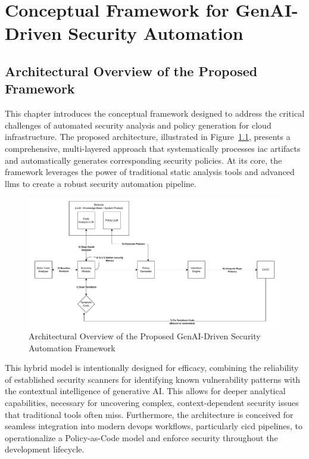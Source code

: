 \chapter{Conceptual Framework for GenAI-Driven Security Automation}


\section{Architectural Overview of the Proposed Framework}

This chapter introduces the conceptual framework designed to address the critical challenges of automated security analysis and policy generation for cloud infrastructure. The proposed architecture, illustrated in Figure~\ref{fig:prototype-architecture}, presents a comprehensive, multi-layered approach that systematically processes \gls{iac} artifacts and automatically generates corresponding security policies. At its core, the framework leverages the power of traditional static analysis tools and advanced \glspl{llm} to create a robust security automation pipeline.

\begin{figure}[htbp]
\centering
\includegraphics[width=\textwidth]{Figures/prototype.pdf}
\caption{Architectural Overview of the Proposed GenAI-Driven Security Automation Framework}
\label{fig:prototype-architecture}
\end{figure}

This hybrid model is intentionally designed for efficacy, combining the reliability of established security scanners for identifying known vulnerability patterns with the contextual intelligence of generative AI. This allows for deeper analytical capabilities, necessary for uncovering complex, context-dependent security issues that traditional tools often miss. Furthermore, the architecture is conceived for seamless integration into modern \gls{devops} workflows, particularly \gls{cicd} pipelines, to operationalize a Policy-as-Code model and enforce security throughout the development lifecycle.


